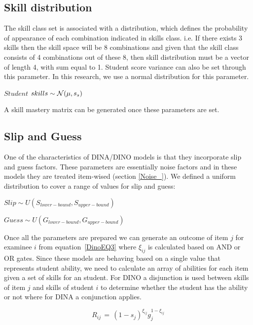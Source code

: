 \subsection{Skill distribution}

The skill class set is associated with a distribution, which defines the probability of appearance of each combination indicated in skills class. i.e. If there exists 3 skills then the skill space will be 8 combinations and given that the skill class consists of 4 combinations out of these 8, then skill distribution must be a vector of length 4, with sum equal to 1. Student score variance can also be set through this parameter. In this research, we use a normal distribution for this parameter.



\begin{center}
$Student$  $skills \sim \mathcal{N}(\mu, s_s)$
\end{center}

A skill mastery matrix can be generated once these parameters are set.


\subsection{Slip and Guess}
One of the characteristics of DINA/DINO models is that they incorporate slip and guess factors. These parameters are essentially noise factors and in these models they are treated item-wised (section \ref{Noise_}). We defined a uniform distribution to cover a range of values for slip and guess:


\begin{center}
$Slip \sim \textit{U}(S_{lower-bound}, S_{upper-bound})$

$Guess \sim \textit{U}(G_{lower-bound}, G_{upper-bound})$
\end{center}

Once all the parameters are prepared we can generate an outcome of item $j$ for examinee $i$ from equation~\ref{DinoEQ3} where $\xi_{ij}$ is calculated based on AND or OR gates. Since these models are behaving based on a single value that represents student ability, we need to calculate an array of abilities for each item given a set of skills for an student. For DINO a disjunction is used between skills of item $j$ and skills of student $i$ to determine whether the student has the ability or not where for DINA a conjunction applies.

\begin{equation}
 R_{ij} \,=\, (1-s_j)^{\xi_{ij}} g_j^{1-\xi_{ij}}
\label{DinoEQ3}
\end{equation}

